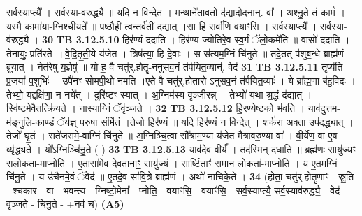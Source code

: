 \documentclass[17pt]{extarticle}
\begin{document}
{{{{{{{{{{{{{{{{{{{{{{{                  सर्व॒स्याप्त्यै᳚ । सर्व॒स्या-व॑रुद्ध्यै ॥ यदि॒ न वि॒न्देत॑ । म॒न्थाने॑ताव॒तो द॑द्यादोद॒नान्. वा᳚ । अ॒श्नु॒ते तं कामं᳚ । यस्मै॒ कामा॑या॒-ग्निश्ची॒यते᳚ ॥ प॒ष्ठौ॒हीं त्व॒न्तर्व॑तीं दद्यात् ।सा हि सर्वा॑णि॒ वयाꣳ॑सि । सर्व॒स्याप्त्यै᳚ । सर्व॒स्या-व॑रुद्ध्यै । \textbf{ 30} \newline
                  \newline
                                \textbf{ TB 3.12.5.10} \newline
                  हिर॑ण्यं ददाति । हिर॑ण्य-ज्योतिरे॒व स्व॒र्गं ॅलो॒कमे॑ति ॥ वासो॑ ददाति । तेनायुः॒ प्रति॑रते ॥ वे॒दि॒तृ॒ती॒ये य॑जेत । त्रिष॑त्या॒ हि दे॒वाः । स स॑त्यम॒ग्निं चि॑नुते ॥ तदे॒तत् प॑शुब॒न्धे ब्राह्म॑णं ब्रूयात् । नेत॑रेषु य॒ज्ञेषु॑ ॥ यो ह॒ वै चतु॑र्.होतॄ-ननुसव॒नं त॑र्पयित॒व्यान्॑. वेद॑ \textbf{ 31} \newline
                  \newline
                                \textbf{ TB 3.12.5.11} \newline
                  तृप्य॑ति प्र॒जया॑ प॒शुभिः॑ । उपै॑नꣳ सोमपी॒थो न॑मति ।ए॒ते वै चतु॑र्.होतारो ऽनुसव॒नं त॑र्पयित॒व्याः᳚ । ये ब्रा᳚ह्म॒णा ब॑हु॒विदः॑ ।तेभ्यो॒ यद्दक्षि॑णा॒ न नये᳚त् । दुरि॑ष्टꣳ स्यात् । अ॒ग्निम॑स्य वृञ्जीरन्न् । तेभ्यो॑ यथा श्र॒द्धं द॑द्यात् । स्वि॑ष्टमे॒वैतत्क्रि॑यते । नास्या॒ग्निं ॅवृ॑ञ्जते । \textbf{ 32} \newline
                  \newline
                                \textbf{ TB 3.12.5.12} \newline
                  हि॒र॒ण्ये॒ष्ट॒को भ॑वति । याव॑दुत्त॒म-म॑ङ्गुलि-का॒ण्डं ॅय॑ज्ञ् प॒रुषा॒ संमि॑तं ।तेजो॒ हिर॑ण्यं ॥ यदि॒ हिर॑ण्यं॒ न वि॒न्देत् । शर्क॑रा अ॒क्ता उप॑दद्ध्यात् । तेजो॑ घृ॒तं । सते॑जसमे॒-वाग्निं चि॑नुते ॥ अ॒ग्निञ्चि॒त्वा सौ᳚त्राम॒ण्या य॑जेत मैत्रावरु॒ण्या वा᳚ । वी॒र्ये॑ण॒ वा ए॒ष व्यृ॑द्ध्यते । यो᳚ऽग्निञ्चि॑नु॒ते ( ) \textbf{ 33} \newline
                  \newline
                                \textbf{ TB 3.12.5.13} \newline
                  याव॑दे॒व वी॒र्यं᳚ । तद॑स्मिन् दधाति ॥ ब्रह्म॑णः॒ सायु॑ज्यꣳ सलो॒कता॑-माप्नोति । ए॒तासा॑मे॒व दे॒वता॑नाꣳ॒॒ सायु॑ज्यं । सा॒र्ष्टिताꣳ॑ समान लो॒कता॑-माप्नोति । य ए॒तम॒ग्निं चि॑नु॒ते । य उ॑चैनमे॒वं ॅवेद॑ ॥ ए॒तदे॒व सा॑वि॒त्रे ब्राह्म॑णं । अथो॑ नाचिके॒ते । \textbf{ 34} \newline
                  \newline
                                    (होता॒ चतु॑र्.होतॄणाꣳ - स्रु॒ति - श्च॑कार - वा - भवन्त्य - ग्निष्टो॒मेना᳚ - प्नोति॒ - वयाꣳ॑सि॒ - वयाꣳ॑सि॒ - सर्व॒स्याप्त्यै॒ सर्व॒स्याव॑रुद्ध्यै॒ - वेद॑ - वृञ्जते - चिनु॒ते - +नव॑ च) \textbf{(A5)} \newline \newline
}}}}}}}}}}}}}}}}}}}}}}}
\end{document}
